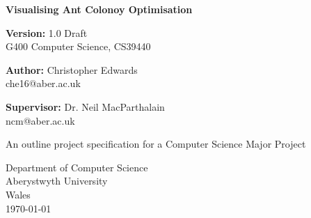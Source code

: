 \documentclass[10pt,a4paper]{article}
\begin{document}
\begin{titlepage}
    \begin{center}
        \vspace{1cm}
        
        \Huge
        \textbf{Visualising Ant Colonoy Optimisation}
        
	 \vspace{0.5cm}
        \Large
	 \textbf{Version:} 1.0 Draft \\
        G400  Computer Science, CS39440
	  

        \vspace{1.0cm}
        
	  \Large
        \textbf{Author:} Christopher Edwards \\
         che16@aber.ac.uk

 	  \vspace{0.8cm}
 	  \textbf{Supervisor:} Dr. Neil MacParthalain \\
         ncm@aber.ac.uk
        
        \vspace{3.0cm}
        
        An outline project specification for a Computer Science Major Project
                
        \vspace{0.8cm}
                
        \Large
        Department of Computer Science\\
        Aberystwyth University\\
        Wales\\
        \today
        
	\end{center}
\end{titlepage}
\end{document}

